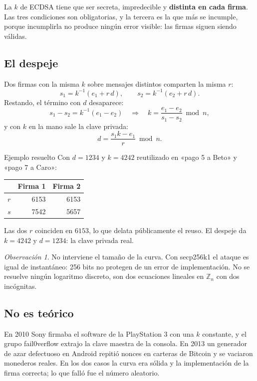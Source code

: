 \documentclass[11pt,a4paper]{article}
\theoremstyle{definition}
\theoremstyle{plain}
\theoremstyle{remark}
\newtheorem*{observacion}{Observación}
\begin{document}
La $k$ de ECDSA tiene que ser secreta, impredecible y \textbf{distinta en cada
firma}. Las tres condiciones son obligatorias, y la tercera es la que más se
incumple, porque incumplirla no produce ningún error visible: las firmas siguen
siendo válidas.

\subsection{El despeje}

Dos firmas con la misma $k$ sobre mensajes distintos comparten la misma $r$:
\[
  s_1 = k^{-1}(e_1 + r\,d), \qquad s_2 = k^{-1}(e_2 + r\,d).
\]
Restando, el término con $d$ desaparece:
\[
  s_1 - s_2 = k^{-1}(e_1 - e_2)
  \quad\Longrightarrow\quad
  k = \frac{e_1 - e_2}{s_1 - s_2} \bmod n,
\]
y con $k$ en la mano sale la clave privada:
\[
  d = \frac{s_1 k - e_1}{r} \bmod n.
\]

\begin{laboratorio}{Ejemplo resuelto}
Con $d = 1234$ y $k = 4242$ reutilizado en «pago 5 a Beto» y «pago 7 a Caro»:

\begin{center}
\small
\begin{tabular}{@{}lrr@{}}
\toprule
 & Firma 1 & Firma 2 \\
\midrule
$r$ & 6153 & 6153 \\
$s$ & 7542 & 5657 \\
\bottomrule
\end{tabular}
\end{center}

Las dos $r$ coinciden en $6153$, lo que delata públicamente el reuso. El despeje da
$k = 4242$ y $d = 1234$: la clave privada real.
\end{laboratorio}

\begin{observacion}
No interviene el tamaño de la curva. Con secp256k1 el ataque es igual de
instantáneo: 256 bits no protegen de un error de implementación. No se resuelve
ningún logaritmo discreto, son dos ecuaciones lineales en $\mathbb{Z}_n$ con dos
incógnitas.
\end{observacion}

\subsection{No es teórico}

En 2010 Sony firmaba el software de la PlayStation 3 con una $k$ constante, y el
grupo fail0verflow extrajo la clave maestra de la consola. En 2013 un generador
de azar defectuoso en Android repitió nonces en carteras de Bitcoin y se vaciaron
monederos reales. En los dos casos la curva era sólida y la implementación de la
firma correcta; lo que falló fue el número aleatorio.
\end{document}
